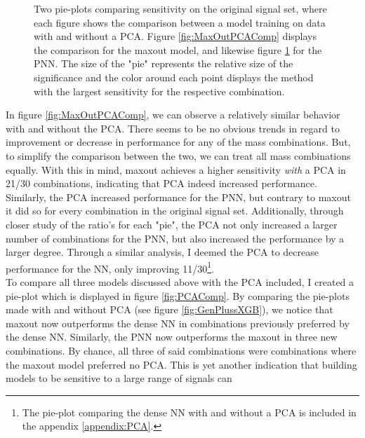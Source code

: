 \begin{figure}
{\begin{subfigure}{.6\textwidth}
        \vspace{-.75cm}
        \caption{}
        \label{fig:PNNPCAComp}
    \end{subfigure}
    }
    \caption[Two pie-plots comparing the sensitivity on the original signal set, where each figure shows the comparison between a model (maxout and \ac{PNN}) training on data 
    with and without a \ac{PCA}.]{Two pie-plots comparing sensitivity on the original signal set, where each figure shows the comparison between a model training on data 
    with and without a \ac{PCA}. Figure \ref{fig:MaxOutPCAComp} displays the comparison for the maxout model, and likewise figure \ref{fig:PNNPCAComp} 
    for the \ac{PNN}. The size of the "pie" represents the relative size of the significance and the color around each 
    point displays the method with the largest sensitivity for the respective combination.}
    \label{fig:PCAComp2}
\end{figure}
In figure \ref{fig:MaxOutPCAComp}, we can observe a relatively similar behavior with and without the \ac{PCA}. There seems to be no obvious trends in regard 
to improvement or decrease in performance for any of the mass combinations. But, to simplify the comparison between the two, we can treat all mass combinations
equally. With this in mind, maxout achieves a higher sensitivity \emph{with} a \ac{PCA} in 21/30 combinations, indicating that \ac{PCA} indeed increased performance.
Similarly, the \ac{PCA} increased performance for the \ac{PNN}, but contrary to maxout it did so for every combination in the original signal set. Additionally,
through closer study of the ratio's for each "pie", the \ac{PCA} not only increased a larger number of combinations for the \ac{PNN}, but also increased the performance
by a larger degree. Through a similar analysis, I deemed the \ac{PCA} to decrease performance for the \ac{NN}, only improving 11/30\footnote{The pie-plot comparing the 
dense \ac{NN} with and without a \ac{PCA} is included in the appendix \ref{appendix:PCA}.}. 
\\
To compare all three models discussed above with the \ac{PCA} included, I created a pie-plot which is displayed in figure \ref{fig:PCAComp}. By comparing 
the pie-plots made with and without \ac{PCA} (see figure \ref{fig:GenPlussXGB}), we notice that maxout now outperforms the dense \ac{NN} in combinations 
previously preferred by the dense \ac{NN}. Similarly, the \ac{PNN} now outperforms the maxout in three new combinations. By chance, all three of said combinations 
were combinations where the maxout model preferred no \ac{PCA}. This is yet another indication that building models to be sensitive to a large range of signals can 
